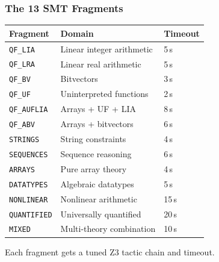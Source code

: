 \begin{frame}
\frametitle{The 13 SMT Fragments}
\centering
\small
\begin{tabular}{lll}
\toprule
\textbf{Fragment} & \textbf{Domain} & \textbf{Timeout}\\
\midrule
\texttt{QF\_LIA}    & Linear integer arithmetic    & 5\,s\\
\texttt{QF\_LRA}    & Linear real arithmetic       & 5\,s\\
\texttt{QF\_BV}     & Bitvectors                   & 3\,s\\
\texttt{QF\_UF}     & Uninterpreted functions       & 2\,s\\
\texttt{QF\_AUFLIA} & Arrays + UF + LIA            & 8\,s\\
\texttt{QF\_ABV}    & Arrays + bitvectors          & 6\,s\\
\texttt{STRINGS}    & String constraints            & 4\,s\\
\texttt{SEQUENCES}  & Sequence reasoning            & 6\,s\\
\texttt{ARRAYS}     & Pure array theory             & 4\,s\\
\texttt{DATATYPES}  & Algebraic datatypes           & 5\,s\\
\texttt{NONLINEAR}  & Nonlinear arithmetic          & 15\,s\\
\texttt{QUANTIFIED} & Universally quantified        & 20\,s\\
\texttt{MIXED}      & Multi-theory combination      & 10\,s\\
\bottomrule
\end{tabular}
\vspace{4pt}

\textcolor{jugeoGreen}{\small Each fragment gets a tuned Z3 tactic chain and timeout.}
\end{frame}

